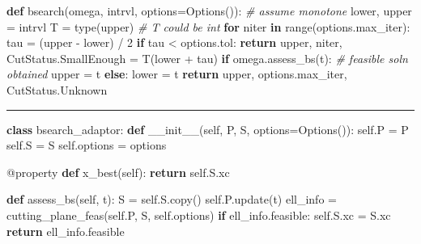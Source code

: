 \documentclass[
]{article}
\newenvironment{Shaded}{}{}
\newcommand{\AttributeTok}[1]{\textcolor[rgb]{0.49,0.56,0.16}{#1}}
\newcommand{\BuiltInTok}[1]{\textcolor[rgb]{0.00,0.50,0.00}{#1}}
\newcommand{\CommentTok}[1]{\textcolor[rgb]{0.38,0.63,0.69}{\textit{#1}}}
\newcommand{\ControlFlowTok}[1]{\textcolor[rgb]{0.00,0.44,0.13}{\textbf{#1}}}
\newcommand{\DecValTok}[1]{\textcolor[rgb]{0.25,0.63,0.44}{#1}}
\newcommand{\FunctionTok}[1]{\textcolor[rgb]{0.02,0.16,0.49}{#1}}
\newcommand{\KeywordTok}[1]{\textcolor[rgb]{0.00,0.44,0.13}{\textbf{#1}}}
\newcommand{\NormalTok}[1]{#1}
\newcommand{\OperatorTok}[1]{\textcolor[rgb]{0.40,0.40,0.40}{#1}}
\newcommand{\VariableTok}[1]{\textcolor[rgb]{0.10,0.09,0.49}{#1}}
\begin{document}
\begin{Shaded}
\begin{Highlighting}[]
\KeywordTok{def}\NormalTok{ bsearch(omega, intrvl, options}\OperatorTok{=}\NormalTok{Options()):}
    \CommentTok{\# assume monotone}
\NormalTok{    lower, upper }\OperatorTok{=}\NormalTok{ intrvl}
\NormalTok{    T }\OperatorTok{=} \BuiltInTok{type}\NormalTok{(upper)  }\CommentTok{\# T could be \textasciigrave{}int\textasciigrave{}}
    \ControlFlowTok{for}\NormalTok{ niter }\KeywordTok{in} \BuiltInTok{range}\NormalTok{(options.max\_iter):}
\NormalTok{        tau }\OperatorTok{=}\NormalTok{ (upper }\OperatorTok{{-}}\NormalTok{ lower) }\OperatorTok{/} \DecValTok{2}
        \ControlFlowTok{if}\NormalTok{ tau }\OperatorTok{\textless{}}\NormalTok{ options.tol:}
            \ControlFlowTok{return}\NormalTok{ upper, niter, CutStatus.SmallEnough}
\NormalTok{        \gamma }\OperatorTok{=}\NormalTok{ T(lower }\OperatorTok{+}\NormalTok{ tau)}
        \ControlFlowTok{if}\NormalTok{ omega.assess\_bs(t):  }\CommentTok{\# feasible sol\textquotesingle{}n obtained}
\NormalTok{            upper }\OperatorTok{=}\NormalTok{ t}
        \ControlFlowTok{else}\NormalTok{:}
\NormalTok{            lower }\OperatorTok{=}\NormalTok{ t}
    \ControlFlowTok{return}\NormalTok{ upper, options.max\_iter, CutStatus.Unknown}
\end{Highlighting}
\end{Shaded}

\begin{center}\rule{0.5\linewidth}{0.5pt}\end{center}

\begin{Shaded}
\begin{Highlighting}[]
\KeywordTok{class}\NormalTok{ bsearch\_adaptor:}
    \KeywordTok{def} \FunctionTok{\_\_init\_\_}\NormalTok{(}\VariableTok{self}\NormalTok{, P, S, options}\OperatorTok{=}\NormalTok{Options()):}
        \VariableTok{self}\NormalTok{.P }\OperatorTok{=}\NormalTok{ P}
        \VariableTok{self}\NormalTok{.S }\OperatorTok{=}\NormalTok{ S}
        \VariableTok{self}\NormalTok{.options }\OperatorTok{=}\NormalTok{ options}

    \AttributeTok{@property}
    \KeywordTok{def}\NormalTok{ x\_best(}\VariableTok{self}\NormalTok{):}
        \ControlFlowTok{return} \VariableTok{self}\NormalTok{.S.xc}

    \KeywordTok{def}\NormalTok{ assess\_bs(}\VariableTok{self}\NormalTok{, t):}
\NormalTok{        S }\OperatorTok{=} \VariableTok{self}\NormalTok{.S.copy()}
        \VariableTok{self}\NormalTok{.P.update(t)}
\NormalTok{        ell\_info }\OperatorTok{=}\NormalTok{ cutting\_plane\_feas(}\VariableTok{self}\NormalTok{.P, S, }\VariableTok{self}\NormalTok{.options)}
        \ControlFlowTok{if}\NormalTok{ ell\_info.feasible:}
            \VariableTok{self}\NormalTok{.S.xc }\OperatorTok{=}\NormalTok{ S.xc}
        \ControlFlowTok{return}\NormalTok{ ell\_info.feasible}
\end{Highlighting}
\end{Shaded}
\end{document}

